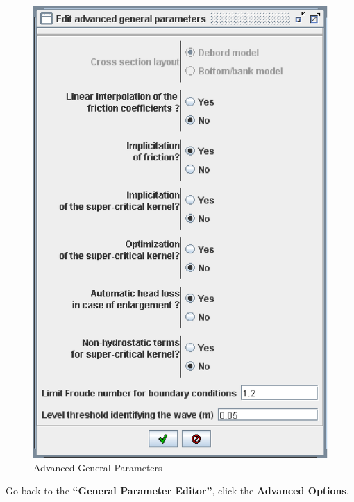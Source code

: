 \documentclass[a4paper,12pt]{article}
\begin{document}
\newpage

\begin{figure}[h]
  \begin{center}
  \includegraphics[scale=0.5]{advanced-params}
  \caption{Advanced General Parameters}
  \label{fig:Advanced-General-Parameters}
  \end{center}
\end{figure}


Go back to the \textbf{{}``General Parameter Editor''}, click the
\textbf{Advanced Options}. 

\vspace{0.5cm}
\end{document}
